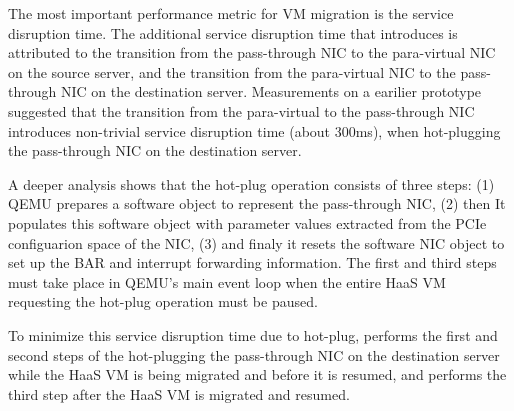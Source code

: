 The most important performance metric for VM migration is the service disruption time.
The additional service disruption time that \na introduces is attributed to the transition from
the pass-through NIC to the para-virtual NIC on the source server, and the transition from
the para-virtual NIC to the pass-through NIC on the destination server.
Measurements on a earilier \na prototype suggested that the transition from the 
para-virtual to the pass-through NIC introduces non-trivial service disruption time (about 300ms), 
when hot-plugging the pass-through NIC on the destination server. 

A deeper analysis shows that the hot-plug operation consists of three steps:
(1) QEMU prepares a software object to represent the pass-through
NIC, (2) then It populates this software object with parameter values extracted 
from the PCIe configuarion space of the NIC, (3) and finaly it
resets the software NIC object to set up the BAR and interrupt forwarding
information. The first and third steps must take place in QEMU's main event
loop when the entire HaaS VM requesting the hot-plug operation must be paused.

To minimize this service disruption time due to hot-plug, 
\na performs the first and second steps of the hot-plugging the pass-through NIC
on the destination server while the HaaS VM is being migrated and before it is resumed, 
and performs the third step after the HaaS VM is migrated and resumed. 


